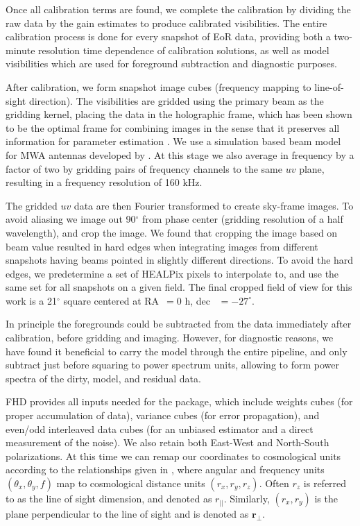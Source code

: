 \documentclass[iop]{emulateapj}
\begin{document}
Once all calibration terms are found, we complete the calibration by dividing the raw data by 
the gain estimates to produce calibrated visibilities. The entire calibration process is done 
for every snapshot of EoR data, providing both a two-minute resolution time dependence of 
calibration solutions, as well as model visibilities which are used for foreground subtraction 
and diagnostic purposes.

After calibration, we form snapshot image cubes (frequency mapping to line-of-sight 
direction). The visibilities are gridded using the primary beam as the gridding kernel, placing 
the data in the holographic frame, which has been shown to be the optimal frame for 
combining images in the sense that it preserves all information for parameter estimation 
\citep{Morales:2009,Bhatnagar:2008}. We use a simulation based beam model for MWA 
antennas developed by \citealt{Sutinjo:2015}. At this stage we also average in frequency by 
a factor of two by gridding pairs of frequency channels to the same $uv$ plane, resulting in 
a frequency resolution of 160 kHz. 

The gridded $uv$ data are then Fourier transformed to create sky-frame images. To avoid 
aliasing we image out 90$^\circ$ from phase center (gridding resolution of a half 
wavelength), and crop the image. We found that cropping the image based on beam value 
resulted in hard edges when integrating images from different snapshots having beams pointed 
in slightly different directions. To avoid the hard edges, we predetermine a set of HEALPix 
pixels to interpolate to, and use the same set for all snapshots on a given field. The final 
cropped field of view for this work is a 21$^\circ$ square centered at RA~$=0$ h, dec~
$=-27^\circ$. 

In principle the foregrounds could be subtracted from the data immediately after calibration, 
before gridding and imaging. However, for diagnostic reasons, we have found it beneficial to 
carry the model through the entire pipeline, and only subtract just before squaring to power 
spectrum units, allowing to form power spectra of the dirty, model, and residual data.

FHD provides all inputs needed for the \eppsilon package, which include weights cubes (for 
proper accumulation of data), variance cubes (for error propagation), and even/odd 
interleaved data cubes (for an unbiased estimator and a direct measurement of the noise). 
We also retain both East-West and North-South polarizations. At this time we can remap 
our coordinates to cosmological units according to the relationships given in 
\citealt{Morales:2004}, where angular and frequency units $(\theta_x,\theta_y,f)$ map to 
cosmological distance units $(r_x,r_y,r_z)$. Often $r_z$ is referred to as the line of sight 
dimension, and denoted as $r_{||}$. Similarly, $(r_x,r_y)$ is the plane perpendicular to the 
line of sight and is denoted as $\mathbf{r_{\perp}}$.
\end{document}

